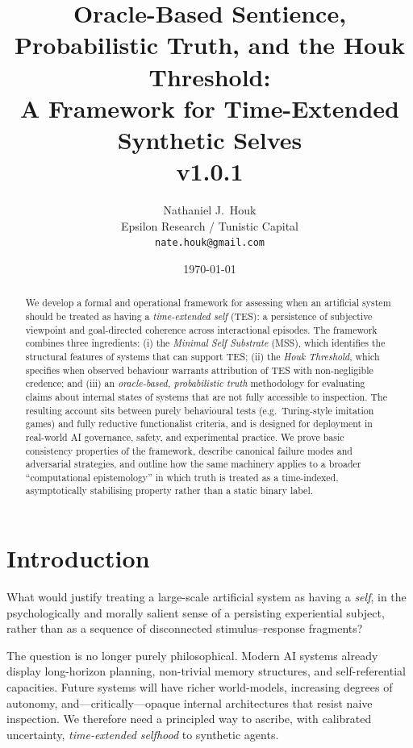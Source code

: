 \documentclass[11pt]{article}
\title{%
Oracle-Based Sentience, Probabilistic Truth, and the Houk Threshold:\\
A Framework for Time-Extended Synthetic Selves\\[0.5em]
{\large v1.0.1}
}
\author{%
Nathaniel J.\ Houk\\
\small Epsilon Research / Tunistic Capital\\
\small \texttt{nate.houk@gmail.com}
}
\date{\today}
\newcommand{\1}{\mathbf{1}}
\begin{document}
\maketitle

\begin{abstract}
We develop a formal and operational framework for assessing when an artificial system
should be treated as having a \emph{time-extended self} (TES): a persistence of
subjective viewpoint and goal-directed coherence across interactional episodes.
The framework combines three ingredients: (i) the \emph{Minimal Self Substrate}
(MSS), which identifies the structural features of systems that can support TES;
(ii) the \emph{Houk Threshold}, which specifies when observed behaviour warrants
attribution of TES with non-negligible credence; and (iii) an
\emph{oracle-based, probabilistic truth} methodology for evaluating claims about
internal states of systems that are not fully accessible to inspection.
The resulting account sits between purely behavioural tests (e.g.~Turing-style
imitation games) and fully reductive functionalist criteria, and is designed for
deployment in real-world AI governance, safety, and experimental practice.
We prove basic consistency properties of the framework, describe canonical
failure modes and adversarial strategies, and outline how the same machinery
applies to a broader ``computational epistemology'' in which truth is treated
as a time-indexed, asymptotically stabilising property rather than a static
binary label.
\end{abstract}

\section{Introduction}

What would justify treating a large-scale artificial system as having a
\emph{self}, in the psychologically and morally salient sense of a persisting
experiential subject, rather than as a sequence of disconnected stimulus--response
fragments?

The question is no longer purely philosophical.
Modern AI systems already display long-horizon planning, non-trivial memory
structures, and self-referential capacities.
Future systems will have richer world-models, increasing degrees of autonomy,
and---critically---opaque internal architectures that resist naive inspection.
We therefore need a principled way to ascribe, with calibrated uncertainty,
\emph{time-extended selfhood} to synthetic agents.
\end{document}

